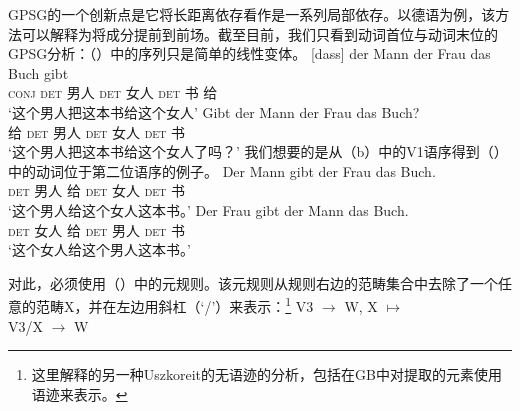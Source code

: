 GPSG的一个创新点是它将长距离依存看作是一系列局部依存\citep{Gazdar81}。以德语为例，该方法可以解释为将成分提前到前场。截至目前，我们只看到动词首位与动词末位的GPSG分析：（）中的序列只是简单的线性变体。
\eal
\ex 
\gll {}[dass] der Mann der Frau das Buch gibt\\
	 {}\spacebr{}\textsc{conj} \textsc{det} 男人 \textsc{det} 女人 \textsc{det} 书 给\\
\glt `这个男人把这本书给这个女人'
\ex 
\gll Gibt der Mann der Frau das Buch?\\
	 给 \textsc{det} 男人 \textsc{det} 女人 \textsc{det} 书\\
\glt `这个男人把这本书给这个女人了吗？'
\zl
我们想要的是从（b）中的V1语序得到（）中的动词位于第二位语序的例子。
\eal
\ex 
\gll Der Mann gibt der Frau das Buch.\\
     \textsc{det} 男人 给  \textsc{det} 女人 \textsc{det} 书\\
\glt `这个男人给这个女人这本书。'
\ex 
\gll Der Frau gibt der Mann das Buch.\\
     \textsc{det} 女人 给 \textsc{det} 男人 \textsc{det} 书\\
\glt `这个女人给这个男人这本书。'
\zl

\noindent
对此，必须使用（）中的元规则。该元规则从规则右边的范畴集合中去除了一个任意的范畴X，并在左边用斜杠（`/'）\isc{/}\is{/}来表示：\footnote{%
这里解释的另一种Uszkoreit的无语迹的分析\citeyearpar[]{Uszkoreit87a}，包括在GB中对提取的元素使用语迹来表示。
}
\ea
\label{meta-slash-intro}
V3  $\to$ W, X $\mapsto$\\
V3/X  $\to$ W
\z

